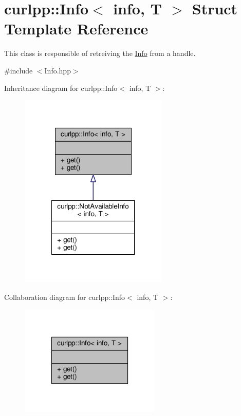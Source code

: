 \hypertarget{structcurlpp_1_1Info}{\section{curlpp\-:\-:Info$<$ info, T $>$ Struct Template Reference}
\label{structcurlpp_1_1Info}
}


This class is responsible of retreiving the \hyperlink{structcurlpp_1_1Info}{Info} from a handle.  




{\ttfamily \#include $<$Info.\-hpp$>$}



Inheritance diagram for curlpp\-:\-:Info$<$ info, T $>$\-:
\nopagebreak
\begin{figure}[H]
\begin{center}
\leavevmode
\includegraphics[width=200pt]{structcurlpp_1_1Info__inherit__graph}
\end{center}
\end{figure}


Collaboration diagram for curlpp\-:\-:Info$<$ info, T $>$\-:
\nopagebreak
\begin{figure}[H]
\begin{center}
\leavevmode
\includegraphics[width=190pt]{structcurlpp_1_1Info__coll__graph}
\end{center}
\end{figure}
